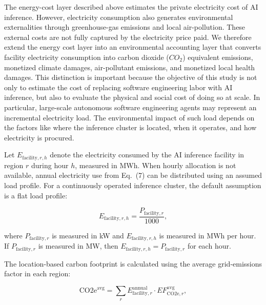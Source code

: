 \documentclass{article}
\begin{document}
The energy-cost layer described above estimates the private electricity cost of AI inference. However, electricity consumption also generates environmental externalities through greenhouse-gas emissions and local air-pollution. These external costs are not fully captured by the electricity price paid. We therefore extend the energy cost layer into an environmental accounting layer that converts facility electricity consumption into carbon dioxide ($CO_2$) equivalent emissions, monetized climate damages, air-pollutant emissions, and monetized local health damages. This distinction is important because the objective of this study is not only to estimate the cost of replacing software engineering labor with AI inference, but also to evaluate the physical and social cost of doing so at scale. In particular, large-scale autonomous software engineering agents may represent an incremental electricity load. The environmental impact of such load depends on the factors like where the inference cluster is located, when it operates, and how electricity is procured. 


Let $E_{\mathrm{facility},r,h}$ denote the electricity consumed by the AI inference facility in region $r$ during hour $h$, measured in MWh. When hourly allocation is not available, annual electricity use from Eq.~(7) can be distributed using an assumed load profile. For a continuously
operated inference cluster, the default assumption is a flat load profile:

\begin{equation}
E_{\mathrm{facility},r,h}
=
\frac{P_{\mathrm{facility},r}}{1000},
\end{equation}

where $P_{\mathrm{facility},r}$ is measured in kW and $E_{\mathrm{facility},r,h}$ is measured in MWh per hour. If $P_{\mathrm{facility},r}$ is measured in MW, then
$E_{\mathrm{facility},r,h}=P_{\mathrm{facility},r}$ for each hour.

The location-based carbon footprint is calculated using the average grid-emissions factor in each region:

\begin{equation}
\mathrm{CO2e}^{\mathrm{avg}}
=
\sum_{r}
E_{\mathrm{facility},r}^{\mathrm{annual}}
\cdot
EF^{\mathrm{avg}}_{\mathrm{CO2e},r},
\end{equation}
\end{document}
